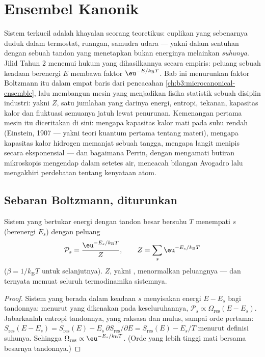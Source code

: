 \chapter{Ensembel Kanonik}\label{ch:b3:canonical-ensemble}

Sistem terkucil adalah khayalan seorang teoretikus: cuplikan yang
sebenarnya duduk dalam termostat, ruangan, samudra udara --- yakni dalam
sentuhan dengan sebuah tandon yang menetapkan bukan energinya melainkan
\emph{suhunya}. Jilid Tahun 2 menemui hukum yang dihasilkannya secara
empiris: peluang sebuah keadaan berenergi $E$ membawa faktor
$\eu^{-E/k_{\text{B}}T}$. Bab ini menurunkan faktor Boltzmann itu dalam
empat baris dari pencacahan \cref{ch:b3:microcanonical-ensemble}, lalu
membangun mesin yang menjadikan fisika statistik sebuah disiplin
industri: yakni \emph{} $Z$, satu jumlahan yang darinya
energi, entropi, tekanan, kapasitas kalor dan fluktuasi semuanya jatuh
lewat penurunan. Kemenangan pertama mesin itu diceritakan di sini:
mengapa kapasitas kalor mati pada suhu rendah (Einstein, 1907 --- yakni
teori kuantum pertama tentang materi), mengapa kapasitas kalor hidrogen
memanjat sebuah tangga, mengapa langit menipis secara eksponensial ---
dan bagaimana Perrin, dengan mengamati butiran mikroskopis mengendap
dalam setetes air, mencacah bilangan Avogadro lalu mengakhiri perdebatan
tentang kenyataan atom.

\section{Sebaran Boltzmann, diturunkan}

\begin{theorem}\label{thm:b3:canonical-ensemble:boltzmann}
Sistem yang bertukar energi dengan tandon besar bersuhu $T$ menempati
 $s$ (berenergi $E_s$) dengan peluang
\[
\mathcal P_s = \frac{\eu^{-E_s/k_{\text{B}}T}}{Z} , \qquad
Z = \sum_s \eu^{-E_s/k_{\text{B}}T}
\]
($\beta = 1/k_{\text{B}}T$ untuk selanjutnya). $Z$, yakni \emph{}, menormalkan peluangnya --- dan ternyata memuat seluruh
termodinamika sistemnya.
\end{theorem}

\begin{proof}
Sistem yang berada dalam keadaan $s$ menyisakan energi $E - E_s$ bagi
tandonnya: menurut  yang dikenakan pada keseluruhannya,
$\mathcal P_s
\propto \Omega_{\text{res}}(E - E_s)$. Jabarkanlah entropi tandonnya,
yang raksasa dan mulus, sampai orde pertama: $S_{\text{res}}(E - E_s)
= S_{\text{res}}(E) - E_s\,\partial S_{\text{res}}/\partial E =
S_{\text{res}}(E) - E_s/T$ menurut definisi suhunya. Sehingga
$\Omega_{\text{res}} \propto \eu^{-E_s/k_{\text{B}}T}$. (Orde yang lebih
tinggi mati bersama besarnya tandonnya.)
\end{proof}

